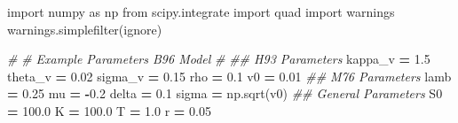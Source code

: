 \documentclass[
]{book}
\newenvironment{Shaded}{\begin{snugshade}}{\end{snugshade}}
\newcommand{\CommentTok}[1]{\textcolor[rgb]{0.56,0.35,0.01}{\textit{#1}}}
\newcommand{\FloatTok}[1]{\textcolor[rgb]{0.00,0.00,0.81}{#1}}
\newcommand{\ImportTok}[1]{#1}
\newcommand{\NormalTok}[1]{#1}
\newcommand{\OperatorTok}[1]{\textcolor[rgb]{0.81,0.36,0.00}{\textbf{#1}}}
\newcommand{\StringTok}[1]{\textcolor[rgb]{0.31,0.60,0.02}{#1}}
\begin{document}
\begin{Shaded}
\begin{Highlighting}[]
\ImportTok{import}\NormalTok{ numpy }\ImportTok{as}\NormalTok{ np}
\ImportTok{from}\NormalTok{ scipy.integrate }\ImportTok{import}\NormalTok{ quad}
\ImportTok{import}\NormalTok{ warnings}
\NormalTok{warnings.simplefilter(}\StringTok{\textquotesingle{}ignore\textquotesingle{}}\NormalTok{)}

\CommentTok{\#}
\CommentTok{\# Example Parameters B96 Model}
\CommentTok{\#}
\CommentTok{\#\# H93 Parameters}
\NormalTok{kappa\_v }\OperatorTok{=} \FloatTok{1.5}
\NormalTok{theta\_v }\OperatorTok{=} \FloatTok{0.02}
\NormalTok{sigma\_v }\OperatorTok{=} \FloatTok{0.15}
\NormalTok{rho }\OperatorTok{=} \FloatTok{0.1}
\NormalTok{v0 }\OperatorTok{=} \FloatTok{0.01}
\CommentTok{\#\# M76 Parameters}
\NormalTok{lamb }\OperatorTok{=} \FloatTok{0.25}
\NormalTok{mu }\OperatorTok{=} \OperatorTok{{-}}\FloatTok{0.2}
\NormalTok{delta }\OperatorTok{=} \FloatTok{0.1}
\NormalTok{sigma }\OperatorTok{=}\NormalTok{ np.sqrt(v0)}
\CommentTok{\#\# General Parameters}
\NormalTok{S0 }\OperatorTok{=} \FloatTok{100.0}
\NormalTok{K }\OperatorTok{=} \FloatTok{100.0}
\NormalTok{T }\OperatorTok{=} \FloatTok{1.0}
\NormalTok{r }\OperatorTok{=} \FloatTok{0.05}


\end{Highlighting}
\end{Shaded}
\end{document}
